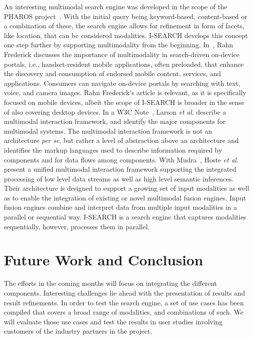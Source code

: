 \documentclass{www2012-comp-accepted}
\begin{document}
An interesting multimodal search engine was developed in the scope of the PHAROS project~\cite{pharos2009}.
With the initial query being keyword-based, content-based or a combination of these, the search engine allows for refinement in form of facets, like location, that can be considered modalities.
\mbox{I-SEARCH} develops this concept one step further by supporting multimodality from the beginning.
In~\cite{multimodalitysun}, Rahn Frederick discusses the importance of multimodality in search-driven on-device portals, i.e., handset-resident mobile applications, often preloaded, that enhance the discovery and consumption of endorsed mobile content, services, and applications.
Consumers can navigate on-device portals by searching with text, voice, and camera images.
Rahn Frederick's article is relevant, as it is specifically focused on mobile devices, albeit the scope of \mbox{I-SEARCH} is broader in the sense of also covering desktop devices. 
In a W3C Note~\cite{w3cmultimodal2003}, Larson \textit{et al.} describe a multimodal interaction framework, and identify the major components for multimodal systems.
The multimodal interaction framework is not an architecture \textit{per se}, but rather a level of abstraction above an architecture and identifies the markup languages used to describe information required by components and for data flows among components.
With Mudra~\cite{mudra2011}, Hoste \textit{et al.} present a unified multimodal interaction framework supporting the integrated processing of low level data streams as well as high level semantic inferences.
Their architecture is designed to support a growing set of input modalities as well as to enable the integration of existing or novel multimodal fusion engines.
Input fusion engines combine and interpret data from multiple input modalities in a parallel or sequential way.
\mbox{I-SEARCH} is a search engine that captures modalities sequentially, however, processes them in parallel.

\section{Future Work and Conclusion} \label{sec:futureworkconclusion}
The efforts in the coming months will focus on integrating the different components.
Interesting challenges lie ahead with the presentation of results and result refinements.
In order to test the search engine, a set of use cases has been compiled that covers a broad range of modalities, and combinations of such.
We will evaluate those use cases and test the results in user studies involving customers of the industry partners in the project.
\end{document}
